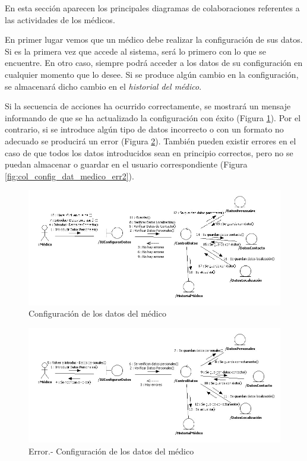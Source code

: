 \documentclass[a4paper,oneside,11pt]{book}
\begin{document}
			En esta sección aparecen los principales diagramas de colaboraciones referentes a las actividades de los médicos.
			
			En primer lugar vemos que un médico debe realizar la configuración de sus datos. Si es la primera vez que accede al sistema, será lo primero con lo que se encuentre. En otro caso, siempre podrá acceder a los datos de su configuración en cualquier momento que lo desee. Si se produce algún cambio en la configuración, se almacenará dicho cambio en el \textit{historial del médico}. 
			
			Si la secuencia de acciones ha ocurrido correctamente, se mostrará un mensaje informando de que se ha actualizado la configuración con éxito (Figura \ref{fig:col_config_dat_medico}). Por el contrario, si se introduce algún tipo de datos incorrecto o con un formato no adecuado se producirá un error (Figura \ref{fig:col_config_dat_medico_err}). También pueden existir errores en el caso de que todos los datos introducidos sean en principio correctos, pero no se puedan almacenar o guardar en el usuario correspondiente (Figura \ref{fig:col_config_dat_medico_err2}).
			\bigskip
			
			\begin{figure}[H]
			  \centering
			    \includegraphics[width=16cm]{img/jpg/colaboraciones/1_ConfiguracionDatosMedico.jpg}
			  \caption{Configuración de los datos del médico}
			  \label{fig:col_config_dat_medico}
			\end{figure}
			
			\bigskip
			\bigskip
			\bigskip
			\begin{figure}[H]
			  \centering
			    \includegraphics[width=16cm]{img/jpg/colaboraciones/2_ConfiguracionDatosMedicoError1.jpg}
			  \caption{Error.- Configuración de los datos del médico}
			  \label{fig:col_config_dat_medico_err}
			\end{figure}
			
\end{document}

